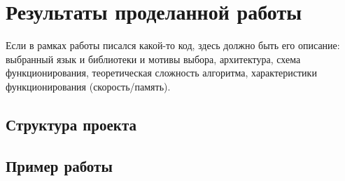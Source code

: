 \chapter{Результаты проделанной работы}
\label{sec:Chapter4} 
Если в рамках работы писался какой-то код, здесь должно быть его описание: выбранный язык и библиотеки и мотивы выбора, архитектура, схема функционирования, теоретическая сложность алгоритма, характеристики функционирования (скорость/память).

\section{Структура проекта}

\section{Пример работы}

\newpage